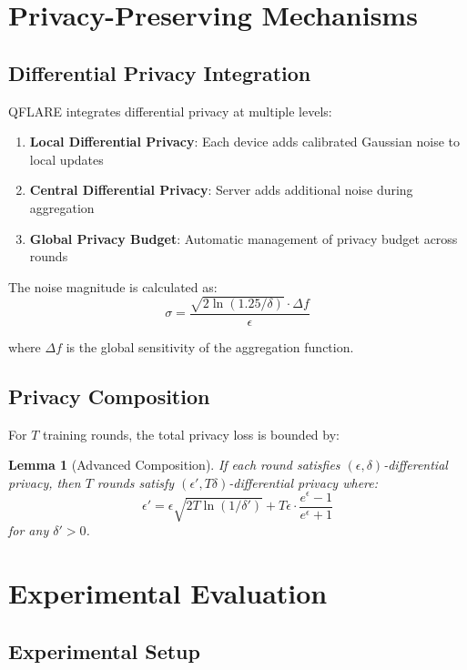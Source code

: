 \documentclass[journal]{IEEEtran}
\newtheorem{lemma}{Lemma}
\begin{document}
\section{Privacy-Preserving Mechanisms}

\subsection{Differential Privacy Integration}

QFLARE integrates differential privacy at multiple levels:

\begin{enumerate}
\item \textbf{Local Differential Privacy}: Each device adds calibrated Gaussian noise to local updates
\item \textbf{Central Differential Privacy}: Server adds additional noise during aggregation
\item \textbf{Global Privacy Budget}: Automatic management of privacy budget across rounds
\end{enumerate}

The noise magnitude is calculated as:
$$\sigma = \frac{\sqrt{2\ln(1.25/\delta)} \cdot \Delta f}{\epsilon}$$

where $\Delta f$ is the global sensitivity of the aggregation function.

\subsection{Privacy Composition}

For $T$ training rounds, the total privacy loss is bounded by:

\begin{lemma}[Advanced Composition]
If each round satisfies $(\epsilon, \delta)$-differential privacy, then $T$ rounds satisfy $(\epsilon', T\delta)$-differential privacy where:
$$\epsilon' = \epsilon\sqrt{2T\ln(1/\delta')} + T\epsilon \cdot \frac{e^\epsilon - 1}{e^\epsilon + 1}$$
for any $\delta' > 0$.
\end{lemma}

\section{Experimental Evaluation}

\subsection{Experimental Setup}
\end{document}

